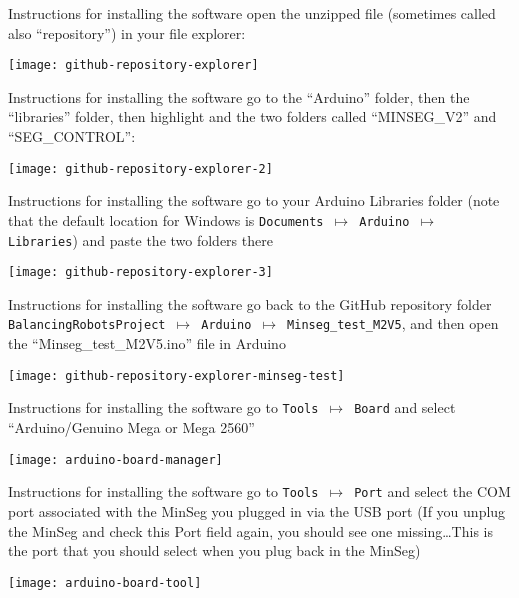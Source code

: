 \begin{frame}{Instructions for installing the software}
	open the unzipped file (sometimes called also ``repository'') in your file explorer:
	\begin{center}
		\texttt{[image: github-repository-explorer]}
	\end{center}
\end{frame}


\begin{frame}{Instructions for installing the software}
	go to the ``Arduino'' folder, then the ``libraries'' folder, then highlight and  the two folders called ``MINSEG\_V2'' and ``SEG\_CONTROL'':
	\begin{center}
		\texttt{[image: github-repository-explorer-2]}
	\end{center}
\end{frame}


\begin{frame}{Instructions for installing the software}
	go to your Arduino Libraries folder (note that the default location for Windows is \texttt{Documents $\mapsto$ Arduino $\mapsto$ Libraries}) and paste the two folders there
	\begin{center}
		\texttt{[image: github-repository-explorer-3]}
	\end{center}
\end{frame}


\begin{frame}{Instructions for installing the software}
	go back to the GitHub repository folder \texttt{BalancingRobotsProject $\mapsto$ Arduino $\mapsto$ Minseg\_test\_M2V5}, and then open the ``Minseg\_test\_M2V5.ino'' file in Arduino
	\begin{center}
		\texttt{[image: github-repository-explorer-minseg-test]}
	\end{center}
\end{frame}


\begin{frame}{Instructions for installing the software}
	go to \texttt{Tools $\mapsto$ Board} and select ``Arduino/Genuino Mega or Mega 2560''
	\begin{center}
		\texttt{[image: arduino-board-manager]}
	\end{center}
\end{frame}


\begin{frame}{Instructions for installing the software}
	go to \texttt{Tools $\mapsto$ Port} and select the COM port associated with the MinSeg you plugged in via the USB port (If you unplug the MinSeg and check this Port field again, you should see one missing\ldots This is the port that you should select when you plug back in the MinSeg)
	\begin{center}
		\texttt{[image: arduino-board-tool]}
	\end{center}
\end{frame}


